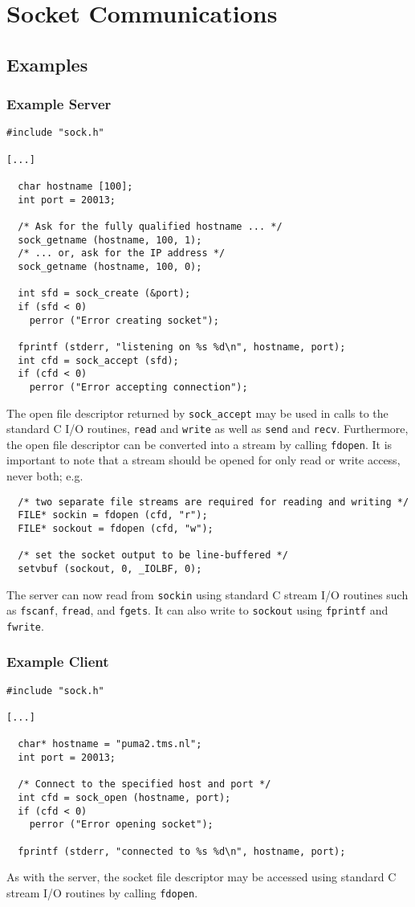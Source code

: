 \chapter{Socket Communications}

\section{Examples}
\subsection{Example Server}

\begin{verbatim}
#include "sock.h"

[...]

  char hostname [100];
  int port = 20013;

  /* Ask for the fully qualified hostname ... */
  sock_getname (hostname, 100, 1);
  /* ... or, ask for the IP address */
  sock_getname (hostname, 100, 0);

  int sfd = sock_create (&port);
  if (sfd < 0)
    perror ("Error creating socket");

  fprintf (stderr, "listening on %s %d\n", hostname, port);
  int cfd = sock_accept (sfd);
  if (cfd < 0)
    perror ("Error accepting connection");
\end{verbatim}
The open file descriptor returned by {\tt sock\_accept} may be used
in calls to the standard C I/O routines, {\tt read} and {\tt write}
as well as {\tt send} and {\tt recv}.  Furthermore, the open file
descriptor can be converted into a stream by calling {\tt fdopen}.
It is important to note that a stream should be opened for only read
or write access, never both; e.g.
\begin{verbatim}
  /* two separate file streams are required for reading and writing */
  FILE* sockin = fdopen (cfd, "r");
  FILE* sockout = fdopen (cfd, "w");

  /* set the socket output to be line-buffered */
  setvbuf (sockout, 0, _IOLBF, 0);
\end{verbatim}
The server can now read from {\tt sockin} using standard C stream I/O
routines such as {\tt fscanf}, {\tt fread}, and {\tt fgets}.  It can
also write to {\tt sockout} using {\tt fprintf} and {\tt fwrite}.

\subsection{Example Client}

\begin{verbatim}
#include "sock.h"

[...]

  char* hostname = "puma2.tms.nl";
  int port = 20013;

  /* Connect to the specified host and port */
  int cfd = sock_open (hostname, port);
  if (cfd < 0)
    perror ("Error opening socket");

  fprintf (stderr, "connected to %s %d\n", hostname, port);
\end{verbatim}
As with the server, the socket file descriptor may be accessed using
standard C stream I/O routines by calling {\tt fdopen}.
